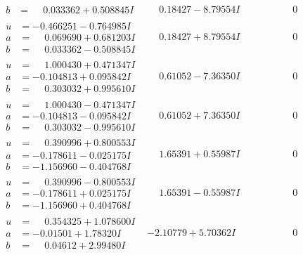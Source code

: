\documentclass[1p]{elsarticle_modified}
\theoremstyle{definition}
\begin{document}
$$\begin{array}{c|c|c}
\begin{aligned}
b &= \phantom{-}0.033362 + 0.508845 I\end{aligned}
 & \phantom{-}0.18427 - 8.79554 I & \phantom{-0.000000 } 0 \\ \hline\begin{aligned}
u &= -0.466251 - 0.764985 I \\
a &= \phantom{-}0.069690 + 0.681203 I \\
b &= \phantom{-}0.033362 - 0.508845 I\end{aligned}
 & \phantom{-}0.18427 + 8.79554 I & \phantom{-0.000000 } 0 \\ \hline\begin{aligned}
u &= \phantom{-}1.000430 + 0.471347 I \\
a &= -0.104813 + 0.095842 I \\
b &= \phantom{-}0.303032 + 0.995610 I\end{aligned}
 & \phantom{-}0.61052 - 7.36350 I & \phantom{-0.000000 } 0 \\ \hline\begin{aligned}
u &= \phantom{-}1.000430 - 0.471347 I \\
a &= -0.104813 - 0.095842 I \\
b &= \phantom{-}0.303032 - 0.995610 I\end{aligned}
 & \phantom{-}0.61052 + 7.36350 I & \phantom{-0.000000 } 0 \\ \hline\begin{aligned}
u &= \phantom{-}0.390996 + 0.800553 I \\
a &= -0.178611 - 0.025175 I \\
b &= -1.156960 - 0.404768 I\end{aligned}
 & \phantom{-}1.65391 + 0.55987 I & \phantom{-0.000000 } 0 \\ \hline\begin{aligned}
u &= \phantom{-}0.390996 - 0.800553 I \\
a &= -0.178611 + 0.025175 I \\
b &= -1.156960 + 0.404768 I\end{aligned}
 & \phantom{-}1.65391 - 0.55987 I & \phantom{-0.000000 } 0 \\ \hline\begin{aligned}
u &= \phantom{-}0.354325 + 1.078600 I \\
a &= -0.01501 + 1.78320 I \\
b &= \phantom{-}0.04612 + 2.99480 I\end{aligned}
 & -2.10779 + 5.70362 I & \phantom{-0.000000 } 0 \\ \hline\begin{aligned}

\end{aligned}
\end{array}$$
\end{document}
